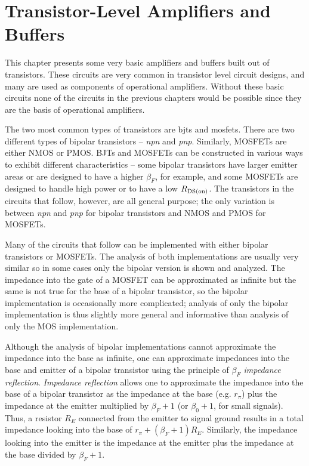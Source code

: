 \chapter{Transistor-Level Amplifiers and Buffers}
This chapter presents some very basic amplifiers and buffers built out of transistors.
These circuits are very common in transistor level circuit designs, and many are used as components of operational amplifiers.
Without these basic circuits none of the circuits in the previous chapters would be possible since they are the basis of operational amplifiers.

The two most common types of transistors are \acp{bjt} and \acp{mosfet}.
There are two different types of bipolar transistors -- \textit{npn} and \textit{pnp}.
Similarly, MOSFETs are either NMOS or PMOS.
BJTs and MOSFETs can be constructed in various ways to exhibit different characteristics -- some bipolar transistors have larger emitter areas or are designed to have a higher $\beta_{F}$, for example, and some MOSFETs are designed to handle high power or to have a low $R_\mathrm{DS(on)}$.
The transistors in the circuits that follow, however, are all general purpose; the only variation is between \textit{npn} and \textit{pnp} for bipolar transistors and NMOS and PMOS for MOSFETs.

Many of the circuits that follow can be implemented with either bipolar transistors or MOSFETs.
The analysis of both implementations are usually very similar so in some cases only the bipolar version is shown and analyzed.
The impedance into the gate of a MOSFET can be approximated as infinite but the same is not true for the base of a bipolar transistor, so the bipolar implementation is occasionally more complicated;
analysis of only the bipolar implementation is thus slightly more general and informative than analysis of only the MOS implementation.

Although the analysis of bipolar implementations cannot approximate the impedance into the base as infinite, one can approximate impedances into the base and emitter of a bipolar transistor using the principle of \textit{$\beta_{F}$ impedance reflection}.
\textit{Impedance reflection} allows one to approximate the impedance into the base of a bipolar transistor as the impedance at the base (e.g. $r_{\pi}$) plus the impedance at the emitter multiplied by $\beta_{F} + 1$ (or $\beta_{0} + 1$, for small signals).
Thus, a resistor $R_{E}$ connected from the emitter to signal ground results in a total impedance looking into the base of $r_{\pi} + (\beta_{F} + 1)R_{E}$.
Similarly, the impedance looking into the emitter is the impedance at the emitter plus the impedance at the base divided by $\beta_{F} + 1$.

